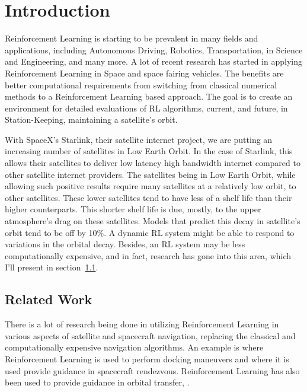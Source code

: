 \chapter{Introduction}\label{ch:intro}

Reinforcement Learning is starting to be prevalent in many fields and applications, including Autonomous Driving, Robotics, Transportation, in Science and Engineering, and many more. A lot of recent research has started in applying Reinforcement Learning in Space and space fairing vehicles. The benefits are better computational requirements from switching from classical numerical methods to a Reinforcement Learning based approach. The goal is to create an environment for detailed evaluations of RL algorithms, current, and future, in Station-Keeping, maintaining a satellite's orbit.

With SpaceX's Starlink, their satellite internet project, we are putting an increasing number of satellites in Low Earth Orbit. In the case of Starlink, this allows their satellites to deliver low latency high bandwidth internet compared to other satellite internet providers. The satellites being in Low Earth Orbit, while allowing such positive results require many satellites at a relatively low orbit, to other satellites. These lower satellites tend to have less of a shelf life than their higher counterparts. This shorter shelf life is due, mostly, to the upper atmosphere's drag on these satellites. Models that predict this decay in satellite's orbit tend to be off by 10\%. A dynamic RL system might be able to respond to variations in the orbital decay. Besides, an RL system may be less computationally expensive, and in fact, research has gone into this area, which I'll present in section~\ref{sec:relatedwork}.



\section{Related Work}\label{sec:relatedwork}

There is a lot of research being done in utilizing Reinforcement Learning in various aspects of satellite and spacecraft navigation, replacing the classical and computationally expensive navigation algorithms. An example is \cite{oestreich2020autonomous} where Reinforcement Learning is used to perform docking maneuvers and \cite{broida2019spacecraft} where it is used provide guidance in spacecraft rendezvous. Reinforcement Learning has also been used to provide guidance in orbital transfer, \cite{miller2019low}.
